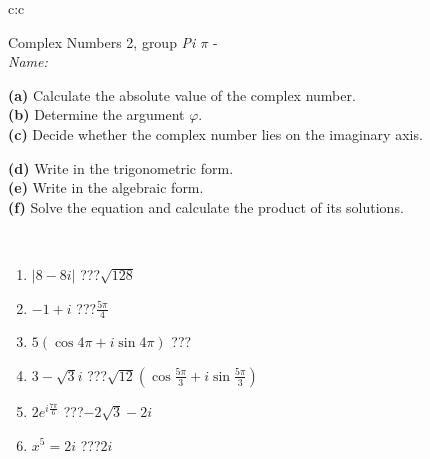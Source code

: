 \documentclass[10pt]{report}
\begin{document}
\newpage
\thispagestyle{empty}
\begin{tabular}{c:c}
\begin{minipage}[c][104.5mm][t]{0.5\linewidth}
\begin{center}
\vspace{5mm}
{\huge Complex Numbers 2, group \textit{Pi $\pi$} -}\\[5mm]
\textit{Name:}\phantom{xxxxxxxxxxxxxxxxxxxxxxxxxxxxxxxxxxxxxxxxxxxxxxxxxxxxxxxxxxxxxxxxx}\\[5mm]
\begin{minipage}{0.95\linewidth}
\begin{center}
{\small \begin{minipage}{0.44\textwidth} \raggedright
\textbf{(a)} Calculate the absolute value of the complex number. \\[1mm]
\textbf{(b)} Determine the argument \(\varphi\). \\[1mm]
\textbf{(c)} Decide whether the complex number lies on the imaginary axis. \end{minipage} \begin{minipage}{0.54\textwidth}
\textbf{(d)} Write in the trigonometric form. \\[1mm]
\textbf{(e)} Write in the algebraic form. \\[1mm]
\textbf{(f)} Solve the equation and calculate the product of its solutions.
\end{minipage}
}
\end{center}
\end{minipage}
\\[1mm]
\begin{minipage}{0.79\linewidth}
\begin{center}
\begin{varwidth}{\linewidth}
\setlength{\itemsep}{0pt}
\begin{enumerate}
\large
\item $|8-8i|$\quad \dotfill\; ???\;\dotfill \quad $\sqrt{128}$
\item $-1+i$\quad \dotfill\; ???\;\dotfill \quad $\frac{5\pi}{4}$
\item $5\left(\cos{4\pi}+i\sin{4\pi}\right)$\quad \dotfill\; ???\;\dotfill \quad {}
\item $3-\sqrt{3}i$\quad \dotfill\; ???\;\dotfill \quad $\sqrt{12}\left(\cos{\frac{5\pi}{3}}+i\sin{\frac{5\pi}{3}}\right)$
\item $2e^{i\frac{7\pi}{6}}$\quad \dotfill\; ???\;\dotfill \quad $-2\sqrt{3}-2i$
\item $x^5=2i$\quad \dotfill\; ???\;\dotfill \quad $2i$

\end{enumerate}
\end{varwidth}
\end{center}
\end{minipage}
\end{center}
\end{minipage}
\end{tabular}
\end{document}
